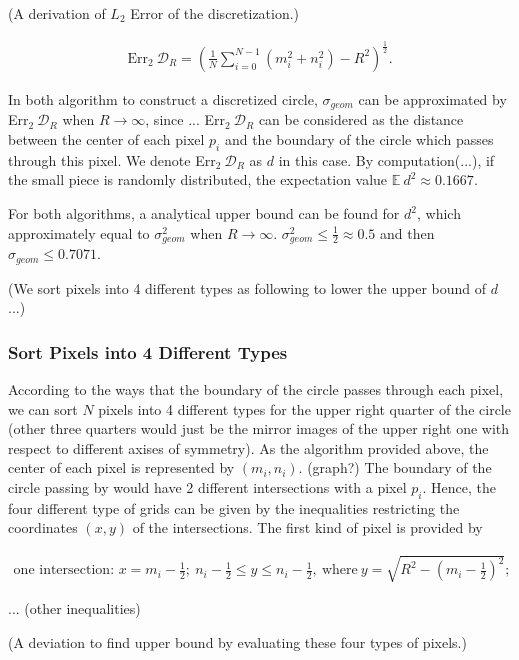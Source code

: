 \documentclass[letterpaper]{article}
\numberwithin{equation}{section} %
\numberwithin{figure}{section} %
\numberwithin{table}{section} %
\begin{document}
(A derivation of $L_{2}$ Error of the discretization.)

\begin{align} 
\text{Err}_2 \ \mathcal{D}_R=(\frac{1}{N} \sum_{i=0}^{N-1} (m_i^2+n_i^2)-R^2)^{\frac{1}{2}}.
\end{align}


In both algorithm to construct a discretized circle, $\sigma_{geom}$ can be approximated by Err$_2 \ \mathcal{D}_R$ when $R \rightarrow \infty$, since ... Err$_2 \ \mathcal{D}_R$ can be considered as the distance between the center of each pixel $p_i$ and the boundary of the circle which passes through this pixel. We denote Err$_2 \ \mathcal{D}_R$ as $d$ in this case. By computation(...), if the small piece is randomly distributed, the expectation value $\mathbb{E}\ d^2 \approx 0.1667$. 

For both algorithms, a analytical upper bound can be found for $d^2$, which approximately equal to $\sigma_{geom}^2$ when $R \rightarrow \infty$. $\sigma_{geom}^2 \leq \frac{1}{2} \approx 0.5$ and then $\sigma_{geom} \leq 0.7071$.

(We sort pixels into 4 different types as following to lower the upper bound of $d$ ...)

\subsubsection{Sort Pixels into 4 Different Types}
According to the ways that the boundary of the circle passes through each pixel, we can sort $N$ pixels into 4 different types for the upper right quarter of the circle (other three quarters would just be the mirror images of the upper right one with respect to different axises of symmetry). As the algorithm provided above, the center of each pixel is represented by $(m_i, n_i)$. (graph?) The boundary of the circle passing by would have 2 different intersections with a pixel $p_i$. Hence, the four different type of grids can be given by the inequalities restricting the coordinates $(x,y)$ of the intersections. The first kind of pixel is provided by  

\begin{align} 
\text{one intersection: } x=m_i-\frac{1}{2}; \ n_i-\frac{1}{2}\leq y \leq n_i-\frac{1}{2}, \ \text{where} \ y=\sqrt{R^2-(m_i-\frac{1}{2})^2};
\end{align}

... (other inequalities)

(A deviation to find upper bound by evaluating these four types of pixels.) 
\end{document}

